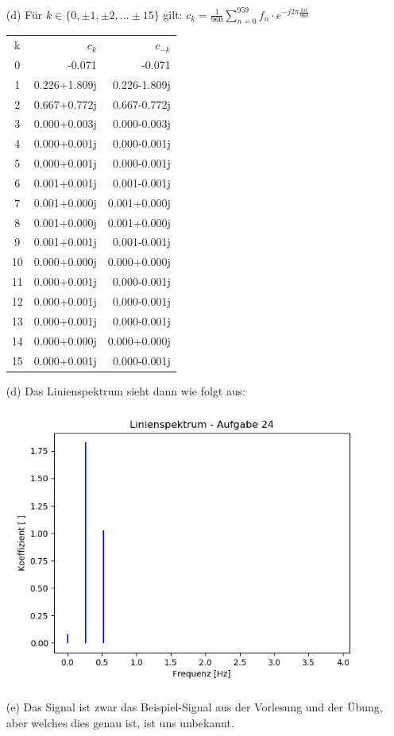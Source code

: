 \begin{itemize}
			\item[(d)] Für $k\in\{ 0, \pm 1, \pm 2, \dots \pm 15 \}$ gilt:
				$c_k = \frac{1}{960}\sum_{n=0}^{959} f_n\cdot e^{-j2\pi\frac{kn}{960}}$\\
			\begin{tabular}{c r r}
				k	&	$c_k$				&	$c_{-k}$\\
				0	&	-0.071				&	-0.071\\
				1	&	 0.226+1.809j		&	0.226-1.809j\\
				2	&	 0.667+0.772j		&	0.667-0.772j\\
				3	&	 0.000+0.003j		&	0.000-0.003j\\
				4	&	 0.000+0.001j		&	0.000-0.001j\\
				5	&	 0.000+0.001j		&	0.000-0.001j\\
				6	&	 0.001+0.001j		&	0.001-0.001j\\
				7	&	 0.001+0.000j		&	0.001+0.000j\\
				8	&	 0.001+0.000j		&	0.001+0.000j\\
				9	&	 0.001+0.001j		&	0.001-0.001j\\
				10	&	 0.000+0.000j		&	0.000+0.000j\\
				11	&	 0.000+0.001j		&	0.000-0.001j\\
				12	&	 0.000+0.001j		&	0.000-0.001j\\
				13	&	 0.000+0.001j		&	0.000-0.001j\\
				14	&	 0.000+0.000j		&	0.000+0.000j\\
				15	&	 0.000+0.001j		&	0.000-0.001j
			\end{tabular}
		\item[(d)] Das Linienspektrum sieht dann wie folgt aus:\\
			\includegraphics[scale = 0.7]{A24_Linienspektrum.png}
		\item[(e)] Das Signal ist zwar das Beispiel-Signal aus der Vorlesung und der Übung, aber welches dies genau ist, ist uns unbekannt.	
	\end{itemize}
